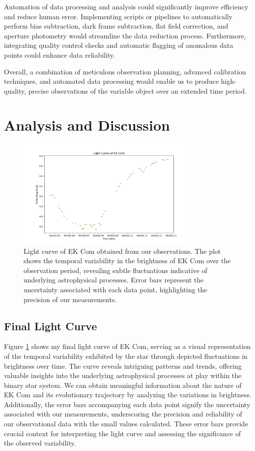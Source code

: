 \documentclass[]{aastex63}
\begin{document}
Automation of data processing and analysis could significantly improve efficiency and reduce human error. Implementing scripts or pipelines to automatically perform bias subtraction, dark frame subtraction, flat field correction, and aperture photometry would streamline the data reduction process. Furthermore, integrating quality control checks and automatic flagging of anomalous data points could enhance data reliability.

Overall, a combination of meticulous observation planning, advanced calibration techniques, and automated data processing would enable us to produce high-quality, precise observations of the variable object over an extended time period.


\section{Analysis and Discussion}

\begin{figure}[h!]
    \centering
    \includegraphics[width=0.8\textwidth]{light_curve_ek_com.png}
    \caption{Light curve of EK Com obtained from our observations. The plot shows the temporal variability in the brightness of EK Com over the observation period, revealing subtle fluctuations indicative of underlying astrophysical processes. Error bars represent the uncertainty associated with each data point, highlighting the precision of our measurements.}
    \label{fig:lightcurve}
\end{figure}

\subsection{Final Light Curve}
Figure \ref{fig:lightcurve} shows my final light curve of EK Com, serving as a visual representation of the temporal variability exhibited by the star through depicted fluctuations in brightness over time. The curve reveals intriguing patterns and trends, offering valuable insights into the underlying astrophysical processes at play within the binary star system. We can obtain meaningful information about the nature of EK Com and its evolutionary trajectory by analyzing the variations in brightness.
\\
Additionally, the error bars accompanying each data point signify the uncertainty associated with our measurements, underscoring the precision and reliability of our observational data with the small values calculated. These error bars provide crucial context for interpreting the light curve and assessing the significance of the observed variability.
\end{document}
